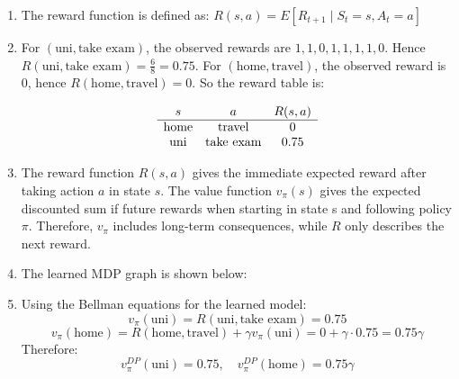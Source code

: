 \documentclass{article}
\begin{document}
\begin{enumerate}
    \item The reward function is defined as: $R(s,a) = {E}[R_{t+1} \mid S_t = s, A_t = a]$

    \item For $(\text{uni},\text{take exam})$, the observed rewards are $1,1,0,1,1,1,1,0$. Hence $R(\text{uni},\text{take exam})=\frac{6}{8}=0.75$. For $(\text{home},\text{travel})$, the observed reward is $0$, hence $R(\text{home},\text{travel})=0$. So the reward table is:

    $$
    \begin{array}{c c c}
    s & a & R(s,a)\\
    \hline
    \text{home} & \text{travel} & 0\\
    \text{uni} & \text{take exam} & 0.75
    \end{array}
    $$

    \item The reward function $R(s,a)$ gives the immediate expected reward after taking action $a$ in state $s$. The value function $v_\pi(s)$ gives the expected discounted sum if future rewards when starting in state s and following policy $\pi$. Therefore, $v_\pi$ includes long-term consequences, while $R$ only describes the next reward.

    \item The learned MDP graph is shown below:
    
    \begin{center}
    \end{center}

    
    \item Using the Bellman equations for the learned model:
    $$
    v_{\pi}(\text{uni}) = R(\text{uni},\text{take exam}) = 0.75
    $$
    $$
    v_{\pi}(\text{home}) = R(\text{home},\text{travel}) + \gamma v_{\pi}(\text{uni}) = 0 + \gamma \cdot 0.75 = 0.75\gamma
    $$
    Therefore:
    $$
    v_{\pi}^{DP}(\text{uni}) = 0.75, \quad v_{\pi}^{DP}(\text{home}) = 0.75\gamma
    $$


\end{enumerate}
\end{document}
